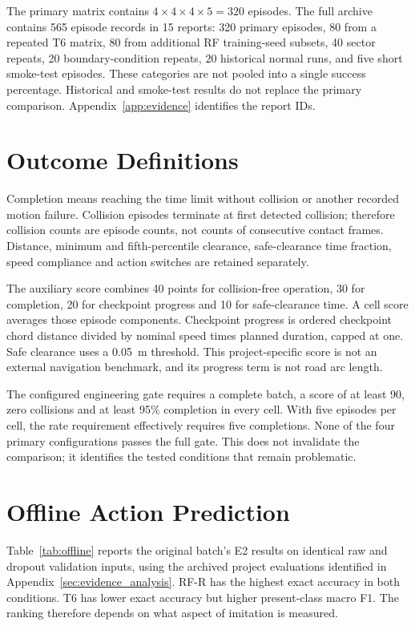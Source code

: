 The primary matrix contains $4\times4\times4\times5=320$ episodes. The full
archive contains 565 episode records in 15 reports: 320 primary episodes,
80 from a repeated T6 matrix, 80 from additional RF training-seed subsets,
40 sector repeats, 20 boundary-condition repeats, 20 historical normal runs,
and five short smoke-test episodes. These categories are not pooled into a
single success percentage. Historical and smoke-test results do not replace
the primary comparison. Appendix~\ref{app:evidence} identifies the report IDs.

\section{Outcome Definitions}
Completion means reaching the time limit without collision or another recorded
motion failure. Collision episodes terminate at first detected collision;
therefore collision counts are episode counts, not counts of consecutive
contact frames. Distance, minimum and fifth-percentile clearance, safe-clearance
time fraction, speed compliance and action switches are retained separately.

The auxiliary score combines 40 points for collision-free operation, 30 for
completion, 20 for checkpoint progress and 10 for safe-clearance time. A cell
score averages those episode components. Checkpoint progress is ordered
checkpoint chord distance divided by nominal speed times planned duration,
capped at one. Safe clearance uses a 0.05~m threshold. This project-specific
score is not an external navigation benchmark, and its progress term is not
road arc length.

The configured engineering gate requires a complete batch, a score of at
least 90, zero collisions and at least 95\% completion in every cell. With
five episodes per cell, the rate requirement effectively requires five
completions. None of the four primary configurations passes the full gate.
This does not invalidate the comparison; it identifies the tested conditions
that remain problematic.

\section{Offline Action Prediction}
Table~\ref{tab:offline} reports the original batch's E2 results on identical
raw and dropout validation inputs, using the archived project evaluations
identified in Appendix~\ref{sec:evidence_analysis}. RF-R has the highest exact accuracy in
both conditions. T6 has lower exact accuracy but higher present-class macro
F1. The ranking therefore depends on what aspect of imitation is measured.

